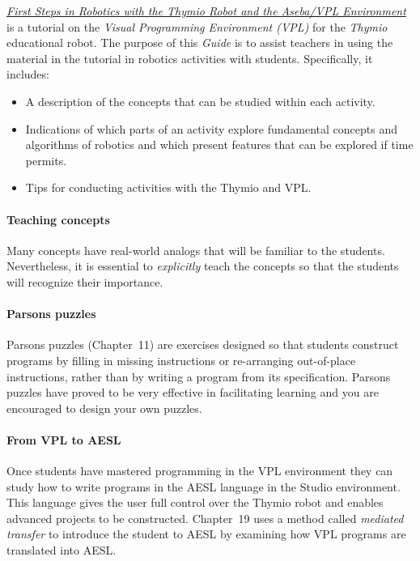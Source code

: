 \documentclass[11pt,a4paper,english]{article}
\begin{document}
\setcounter{page}{1}

\href{https://www.thymio.org/en:visualprogramming}{\emph{First Steps in
Robotics with the Thymio Robot and the Aseba/VPL Environment}} is a
tutorial on the \emph{Visual Programming Environment (VPL)} for the
\emph{Thymio} educational robot. The purpose of this \emph{Guide} is to
assist teachers in using the material in the tutorial in robotics
activities with students. Specifically, it includes:

\begin{itemize}
\item A description of the concepts that can be studied within each activity. 

\item Indications of which parts of an activity explore fundamental
concepts and algorithms of robotics and which present features that can
be explored if time permits.

\item Tips for conducting activities with the Thymio and VPL.

\end{itemize}

\paragraph{Teaching concepts}

Many concepts have real-world analogs that will be familiar to the
students. Nevertheless, it is essential to \emph{explicitly} teach the
concepts so that the students will recognize their importance.

\paragraph{Parsons puzzles}

Parsons puzzles (Chapter~11) are exercises designed so that students
construct programs by filling in missing instructions or re-arranging
out-of-place instructions, rather than by writing a program from its
specification. Parsons puzzles have proved to be very effective in
facilitating learning and you are encouraged to design your own puzzles.

\paragraph{From VPL to AESL}

Once students have mastered programming in the VPL environment they
can study how to write programs in the AESL language in the Studio
environment. This language gives the user full control over the Thymio
robot and enables advanced projects to be constructed. Chapter~19
uses a method called \emph{mediated transfer} to introduce the student
to AESL by examining how VPL programs are translated into AESL.
\end{document}
